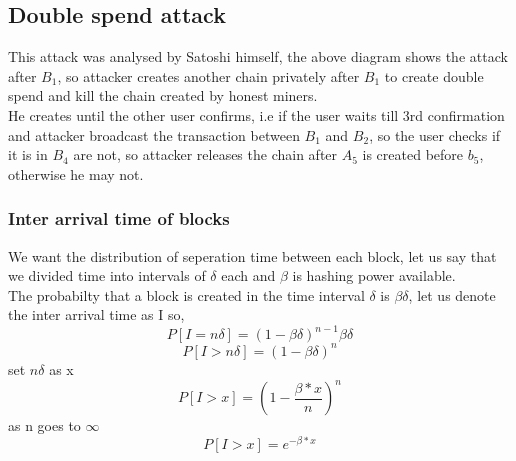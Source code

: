 \documentclass{article}
\begin{document}
\subsection{Double spend attack}
This attack was analysed by Satoshi himself, the above diagram shows the attack after $B_1$, so attacker creates another chain privately after $B_1$ to create double spend and kill the chain created by honest miners. \\
He creates until the other user confirms, i.e if the user waits till 3rd confirmation and attacker broadcast the transaction between $B_1$ and $B_2$, so the user checks if it is in $B_4$ are not, so attacker releases the chain after $A_5$ is created before $b_5$, otherwise he may not.
\begin{center}
\end{center}
\subsubsection{Inter arrival time of blocks}
We want the distribution of seperation time between each block, let us say that we divided time into intervals of $\delta$ each and $\beta$ is hashing power available. \\
The probabilty that a block is created in the time interval $\delta$ is $\beta\delta$, let us denote the inter arrival time as I so,
$$P[I = n\delta ] = (1 - \beta\delta)^{n-1}\beta\delta$$
$$P[I > n\delta ] = (1 - \beta\delta)^{n}$$
set $n\delta$ as x
$$P[I > x ] = (1 - \frac{\beta*x}{n})^{n}$$
as n goes to $\infty$
$$P[I > x ] = e^{-\beta*x}$$
\end{document}
